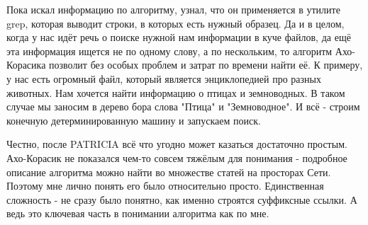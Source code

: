 \documentclass[12pt]{article}
\begin{document}
Пока искал информацию по алгоритму, узнал, что он применяется в утилите grep, которая выводит строки, в которых есть нужный образец. Да и в целом, когда у нас идёт речь о поиске нужной нам информации в куче файлов, да ещё эта информация ищется не по одному слову, а по нескольким, то алгоритм Ахо-Корасика позволит без особых проблем и затрат по времени найти её. К примеру, у нас есть огромный файл, который является энциклопедией про разных животных. Нам хочется найти информацию о птицах и земноводных. В таком случае мы заносим в дерево бора слова "Птица" и "Земноводное". И всё - строим конечную детерминированную машину и запускаем поиск.

Честно, после PATRICIA всё что угодно может казаться достаточно простым. Ахо-Корасик не показался чем-то совсем тяжёлым для понимания - подробное описание алгоритма можно найти во множестве статей на просторах Сети. Поэтому мне лично понять его было относительно просто. Единственная сложность - не сразу было понятно, как именно строятся суффиксные ссылки. А ведь это ключевая часть в понимании алгоритма как по мне.
\end{document}
